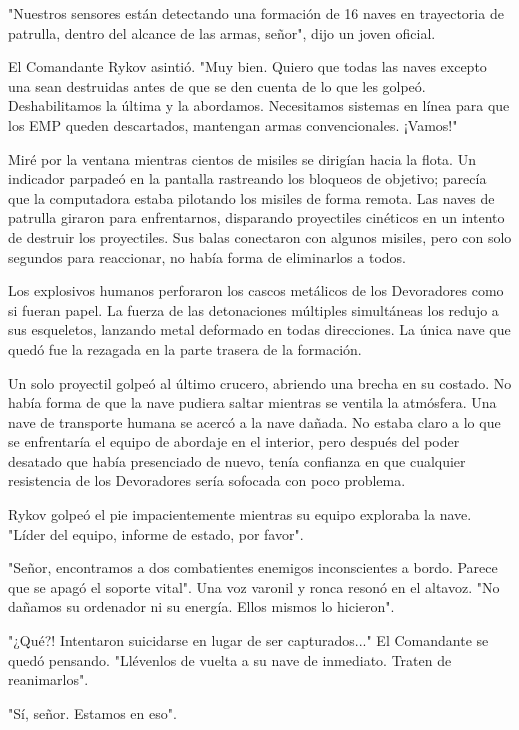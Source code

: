 \documentclass[spanish,12pt,a4paper,oneside,titlepage]{book}
\begin{document}
    "Nuestros sensores están detectando una formación de 16 naves en trayectoria de patrulla, dentro del alcance de las armas, señor", dijo un joven oficial.

    El Comandante Rykov asintió. "Muy bien. Quiero que todas las naves excepto una sean destruidas antes de que se den cuenta de lo que les golpeó. Deshabilitamos la última y la abordamos. Necesitamos sistemas en línea para que los EMP queden descartados, mantengan armas convencionales. ¡Vamos!"

    Miré por la ventana mientras cientos de misiles se dirigían hacia la flota. Un indicador parpadeó en la pantalla rastreando los bloqueos de objetivo; parecía que la computadora estaba pilotando los misiles de forma remota. Las naves de patrulla giraron para enfrentarnos, disparando proyectiles cinéticos en un intento de destruir los proyectiles. Sus balas conectaron con algunos misiles, pero con solo segundos para reaccionar, no había forma de eliminarlos a todos.

    Los explosivos humanos perforaron los cascos metálicos de los Devoradores como si fueran papel. La fuerza de las detonaciones múltiples simultáneas los redujo a sus esqueletos, lanzando metal deformado en todas direcciones. La única nave que quedó fue la rezagada en la parte trasera de la formación.

    Un solo proyectil golpeó al último crucero, abriendo una brecha en su costado. No había forma de que la nave pudiera saltar mientras se ventila la atmósfera. Una nave de transporte humana se acercó a la nave dañada. No estaba claro a lo que se enfrentaría el equipo de abordaje en el interior, pero después del poder desatado que había presenciado de nuevo, tenía confianza en que cualquier resistencia de los Devoradores sería sofocada con poco problema.

    Rykov golpeó el pie impacientemente mientras su equipo exploraba la nave. "Líder del equipo, informe de estado, por favor".

    "Señor, encontramos a dos combatientes enemigos inconscientes a bordo. Parece que se apagó el soporte vital". Una voz varonil y ronca resonó en el altavoz. "No dañamos su ordenador ni su energía. Ellos mismos lo hicieron".

    "¿Qué?! Intentaron suicidarse en lugar de ser capturados..." El Comandante se quedó pensando. "Llévenlos de vuelta a su nave de inmediato. Traten de reanimarlos".

    "Sí, señor. Estamos en eso".
\end{document}
